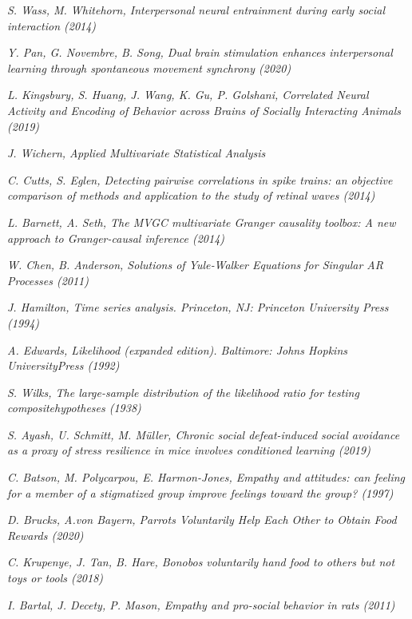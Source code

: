 \begin{thebibliography}{50}
	\textit{S. Wass, M. Whitehorn,  Interpersonal neural entrainment during
		early social interaction (2014)}
	
	\textit{Y. Pan, G. Novembre, B. Song, Dual brain stimulation enhances interpersonal
		learning through spontaneous movement synchrony (2020)}
	
	\textit{L. Kingsbury, S. Huang, J. Wang,
		K. Gu, P. Golshani, Correlated Neural Activity and Encoding of Behavior
		across Brains of Socially Interacting Animals (2019)}
	
	\textit{J. Wichern, Applied Multivariate Statistical Analysis}
	
	\textit{C. Cutts, S. Eglen, Detecting pairwise correlations in spike trains: an objective comparison of methods and application to the study of retinal waves (2014)}
	
	\textit{L. Barnett, A. Seth, The MVGC multivariate Granger causality toolbox: A new approach to Granger-causal inference (2014)}
	
	\textit{W. Chen, B. Anderson, Solutions of Yule‐Walker Equations for Singular AR Processes (2011)}
	
	\textit{J. Hamilton, Time series analysis. Princeton, NJ: Princeton University Press (1994)}
	
	\textit{A. Edwards, Likelihood (expanded edition). Baltimore: Johns Hopkins UniversityPress (1992)}
	
	\textit{S. Wilks, The large-sample distribution of the likelihood ratio for testing compositehypotheses (1938)}
	
	\textit{S. Ayash, U. Schmitt, M. Müller, Chronic social defeat-induced social avoidance as a proxy of stress resilience in mice involves conditioned learning  (2019)}
	
	\textit{C. Batson, M. Polycarpou, E. Harmon-Jones, Empathy and attitudes: can feeling for a member of a stigmatized group improve feelings toward the group?  (1997)}
	
	\textit{D. Brucks,
		A.von Bayern, Parrots Voluntarily Help Each Other to Obtain Food
		Rewards (2020)}
	
	\textit{C. Krupenye, J. Tan, B. Hare, Bonobos voluntarily hand food to others
		but not toys or tools (2018)}
	
	\textit{
		I. Bartal, J. Decety, P. Mason, Empathy and pro-social behavior in rats  (2011)}
	

\end{thebibliography}
